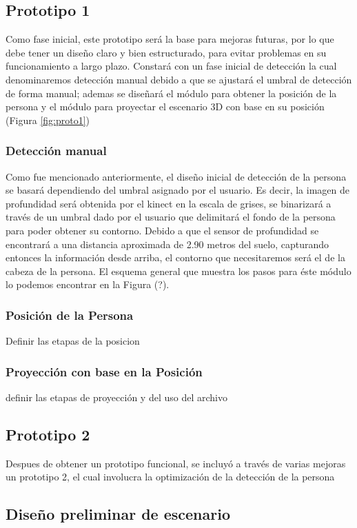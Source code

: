 \documentclass[a4paper,openright,12pt]{report}
\begin{document}
\subsection{Prototipo 1}
Como fase inicial, este prototipo será la base para mejoras futuras, por lo que debe tener un diseño claro y bien estructurado, para evitar problemas en su funcionamiento a largo plazo. Constará con un fase inicial de detección la cual denominaremos detección manual debido a que se ajustará el umbral de detección de forma manual; ademas se diseñará el módulo para obtener la posición de la persona y el módulo para proyectar el escenario 3D con base en su posición (Figura \ref{fig:proto1})

\subsubsection{Detección manual}
Como fue mencionado anteriormente, el diseño inicial de detección de la persona se basará dependiendo del umbral asignado por el usuario. Es decir, la imagen de profundidad será obtenida por el kinect en la escala de grises, se binarizará a través de un umbral dado por el usuario que delimitará el fondo de la persona para poder obtener su contorno. Debido a que el sensor de profundidad se encontrará a una distancia aproximada de 2.90 metros del suelo, capturando entonces la información desde arriba, el contorno que necesitaremos será el de la cabeza de la persona. El esquema general que muestra los pasos para éste módulo lo podemos encontrar en la Figura (?).

\subsubsection{Posición de la Persona}
Definir las etapas de la posicion
\subsubsection{Proyección con base en la Posición}
definir las etapas de proyección y del uso del archivo
\subsection{Prototipo 2}
Despues de obtener un prototipo funcional, se incluyó a través de varias mejoras un prototipo 2, el cual involucra la optimización de la detección de la persona
\subsection{Diseño preliminar de escenario}
\end{document}
